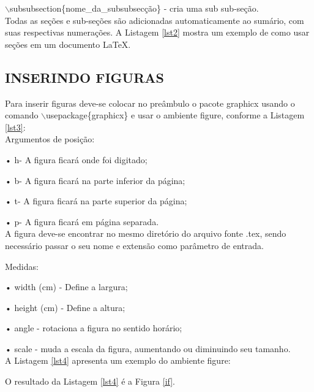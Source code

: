$\backslash$subsubsection\{nome\_da\_subsubsecção\} - cria uma sub sub-seção.\\

Todas as seções e sub-seções são adicionadas automaticamente ao sumário, com suas respectivas numerações. A Listagem \ref{lst2} mostra um exemplo de como usar seções em um documento LaTeX.

\newpage


\subsection{INSERINDO FIGURAS}
Para inserir figuras deve-se colocar no preâmbulo o pacote graphicx usando o comando $\backslash$usepackage\{graphicx\} e usar o ambiente figure, conforme a Listagem \ref{lst3}:\\



Argumentos de posição:

•	h- A figura ficará onde foi digitado;

•	b- A figura ficará na parte inferior da página;

•	t- A figura ficará na parte superior da página;

•	p- A figura ficará em página separada.\\

A figura deve-se encontrar no mesmo diretório do arquivo fonte .tex, sendo necessário passar o seu nome e extensão como parâmetro de entrada.

Medidas:

•	width (cm) - Define a largura;

•	height (cm) - Define a altura;

•	angle - rotaciona a figura no sentido horário;

•	scale - muda a escala da figura, aumentando ou diminuindo seu tamanho.\\

A Listagem \ref{lst4} apresenta um exemplo do ambiente figure:



O resultado da Listagem \ref{lst4} é a Figura \ref{if}.\\

